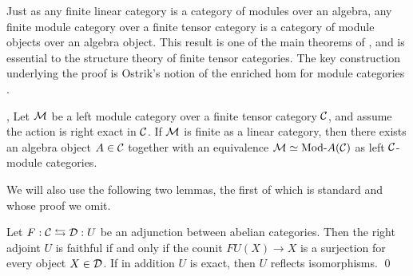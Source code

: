 \documentclass{amsart}
\begin{document}
Just as any finite linear category is a category of modules over an algebra, any finite module category over a finite tensor category is a category of module objects over an algebra object.  This result is one of the main theorems of \cite{EGNO}, and is essential to the structure theory of finite tensor categories.  The key construction underlying the proof is Ostrik's notion of the enriched hom for module categories \cite{MR1976459}.  

\begin{theorem}{\cite[Thm 2.11.6]{EGNO}, \cite[Thm 1]{MR1976459}} \label{thm:EGNO2.11.6}
	Let $\mathcal M$ be a left module category over a finite tensor category $\mathcal C$, and assume the action is right exact in $\mathcal C$. If $\mathcal M$ is finite as a linear category, then there exists an algebra object $A \in \mathcal C$ together with an equivalence $\cM \simeq \Mod{}{A} (\cC)$ as left $\mathcal C$-module categories. 
\end{theorem}

We will also use the following two lemmas, the first of which is standard and whose proof we omit.

\begin{lemma}\label{lem:fiaghtfulrightadjoint}
	Let $F: \mathcal C \leftrightarrows \mathcal D: U$ be an adjunction between abelian categories. Then the right adjoint $U$ is faithful if and only if the counit $FU(X) \to X$ is a surjection for every object $X \in \mathcal D$. If in addition $U$ is exact, then $U$ reflects isomorphisms. \qed
\end{lemma}

%	
%	
\end{document}
